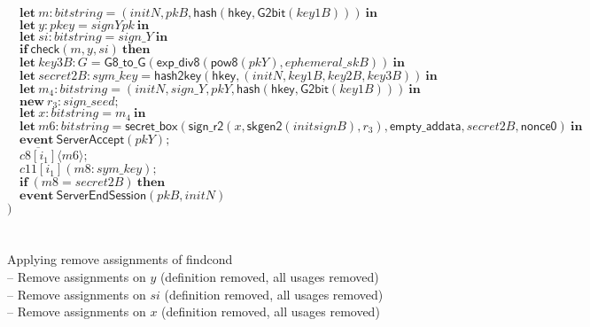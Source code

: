 \documentclass{article}
\newcommand{\cinput}[2]{{#1}({#2})}
\newcommand{\coutput}[2]{\overline{#1}\langle{#2}\rangle}
\newcommand{\kw}[1]{\mathbf{#1}}
\newcommand{\kwf}[1]{\mathsf{#1}}
\newcommand{\var}[1]{\mathit{#1}}
\newcommand{\kwt}[1]{\mathit{#1}}
\newcommand{\kwc}[1]{\mathit{#1}}
\begin{document}
\begin{tabbing}
\>$\quad \kw{let}\ \var{m}: \kwt{bitstring} = \kwf{}(\var{initN}, \var{pkB}, \kwf{hash}(\kwf{hkey}, \kwf{G2bit}(\var{key1B})))\ \kw{in}$\\
\>$\quad \kw{let}\ \var{y}: \kwt{pkey} = \var{signYpk}\ \kw{in}$\\
\>$\quad \kw{let}\ \var{si}: \kwt{bitstring} = \var{sign{\_}Y}\ \kw{in}$\\
\>$\quad \kw{if}\ \kwf{check}(\var{m}, \var{y}, \var{si})\ \kw{then}$\\
\>$\quad \kw{let}\ \var{key3B}: \kwt{G} = \kwf{G8{\_}to{\_}G}(\kwf{exp{\_}div8}(\kwf{pow8}(\var{pkY}), \var{ephemeral{\_}skB}))\ \kw{in}$\\
\>$\quad \kw{let}\ \var{secret2B}: \kwt{sym{\_}key} = \kwf{hash2key}(\kwf{hkey}, \kwf{}(\var{initN}, \var{key1B}, \var{key2B}, \var{key3B}))\ \kw{in}$\\
\>$\quad \kw{let}\ \var{m}_{4}: \kwt{bitstring} = \kwf{}(\var{initN}, \var{sign{\_}Y}, \var{pkY}, \kwf{hash}(\kwf{hkey}, \kwf{G2bit}(\var{key1B})))\ \kw{in}$\\
\>$\quad \kw{new}\ \var{r}_{3}: \kwt{sign{\_}seed};$\\
\>$\quad \kw{let}\ \var{x}: \kwt{bitstring} = \var{m}_{4}\ \kw{in}$\\
\>$\quad \kw{let}\ \var{m6}: \kwt{bitstring} = \kwf{secret{\_}box}(\kwf{sign{\_}r2}(\var{x}, \kwf{skgen2}(\var{initsignB}), \var{r}_{3}), \kwf{empty{\_}addata}, \var{secret2B}, \kwf{nonce0})\ \kw{in}$\\
\>$\quad \kw{event}\ \kwf{ServerAccept}(\var{pkY});$\\
\>$\quad \coutput{\kwc{c8}[\var{i}_{1}]}{\var{m6}};$\\
\>$\quad \cinput{\kwc{c11}[\var{i}_{1}]}{\var{m8}: \kwt{sym{\_}key}};$\\
\>$\quad \kw{if}\ (\var{m8}  =  \var{secret2B})\ \kw{then}$\\
\>$\quad \kw{event}\ \kwf{ServerEndSession}(\var{pkB}, \var{initN})$\\
\>$)$\\
\\
\\
Applying remove assignments of findcond\\
\quad -- Remove assignments on $\var{y}$ (definition removed, all usages removed)\\
\quad -- Remove assignments on $\var{si}$ (definition removed, all usages removed)\\
\quad -- Remove assignments on $\var{x}$ (definition removed, all usages removed)\\

\end{tabbing}
\end{document}
